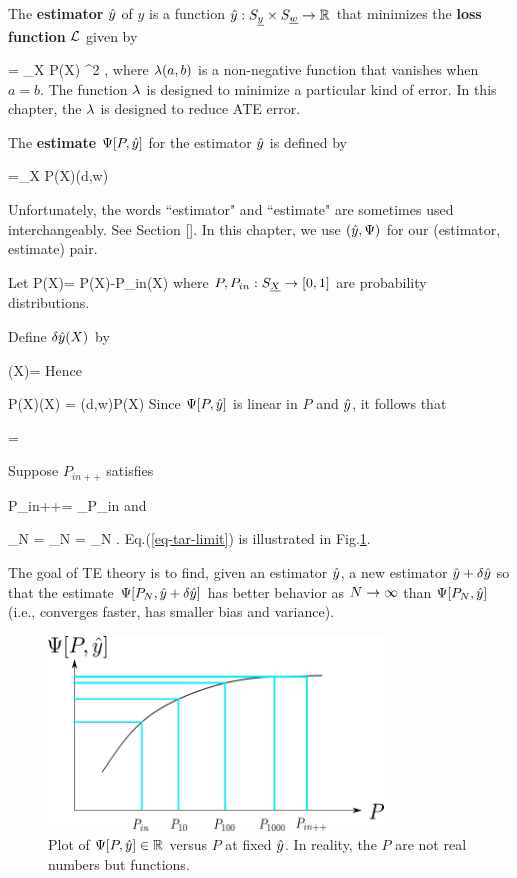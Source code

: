 The {\bf estimator} ${\hat{y}}$ of $y$
is a function ${\hat{y}}:S_{\underline{y}}\times S_{\underline{w}}\rightarrow { \mathbb{R}}$
that minimizes the {\bf loss function} ${\cal L}$
given by


\beq
\call[P, \haty]= \sum_X P(X) \lam[y, \haty(x,w)]^2
\;,
\eeq
where $\lambda(a,b)$ is a
non-negative function
that vanishes when $a=b$.
The function $\lambda$ is designed
to minimize a particular kind of error.
In this chapter, the $\lambda$
is designed to reduce ATE error.




The {\bf estimate}
 $\Psi[P, {\hat{y}}]$ for the estimator ${\hat{y}}$
is defined by

\beq
\Psi[P, \haty] =\sum_X P(X)\haty(d,w)
\eeq

Unfortunately, the words ``estimator"
and ``estimate" are sometimes used
interchangeably. See Section
[].
In this chapter, we use $({\hat{y}}, \Psi)$
for our (estimator, estimate) pair.


Let
\beq
\delta P(X)=
P(X)-P_{in}(X)
\eeq
where $P, P_{in}:S_{\underline{X}}\rightarrow [0,1]$ are
probability distributions.

Define $\delta{\hat{y}}(X)$ by

\beq
\delta\haty(X)= 
\eeq
Hence

\beq
P(X)\delta\haty(X) = \haty(d,w)\delta P(X)
\eeq
Since $\Psi[P, {\hat{y}}]$
is linear in $P$ and ${\hat{y}}$,
it follows that

\beq
{}=
\eeq


Suppose $P_{in++}$ satisfies


\beq
P_{in++}= \argmin_{P_{in}}\call[P_{in}, \haty]
\eeq
and

\beq
\lim_{N\rarrow \infty}
=
\lim_{N\rarrow \infty}
=
\lim_{N\rarrow \infty}
\Psi[P_N, \haty]
\label{eq-tar-limit}
\;.
\eeq
Eq.(\ref{eq-tar-limit}) is illustrated in
Fig.\ref{fig-targeted-p-psi-plot.png}.

The goal of TE theory
is to find, given an estimator ${\hat{y}}$,
a new estimator ${\hat{y}} +\delta {\hat{y}}$
so that the
estimate $\Psi[P_N, {\hat{y}}+\delta {\hat{y}}]$
has better behavior as $N\rightarrow \infty$ than
$\Psi[P_N, {\hat{y}}]$ (i.e., converges faster,
has smaller bias and variance).


\begin{figure}[h!]
\centering
\includegraphics[width=3.5in]
{targeted-est/targeted-p-psi-plot.png}
\caption{
Plot of $\Psi[P, {\hat{y}}]\in { \mathbb{R}}$ versus $P$
at fixed ${\hat{y}}$.
In reality, the $P$ are not real numbers but
functions.
}
\label{fig-targeted-p-psi-plot.png}
\end{figure}


